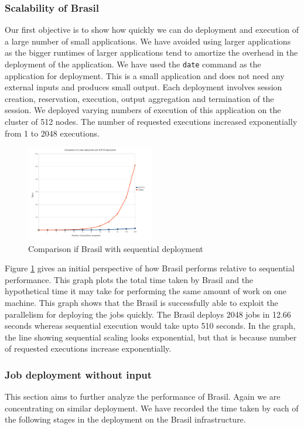 \documentclass[conference]{sig-alternate}
\begin{document}
\subsubsection{Scalability of Brasil}
Our first objective is to show how quickly we can do deployment and execution
of a large number of small applications. We have avoided using larger
applications as the bigger runtimes of larger applications tend to amortize the
overhead in the deployment of the application.  We have used the \texttt{date}
command as the application for deployment.  This is a small application and does
not need any external inputs and produces small output. Each deployment involves
session creation, reservation, execution, output aggregation and termination
of the session.  We deployed varying numbers of execution of this application on
the cluster of 512 nodes.  The number of requested executions increased
exponentially from 1 to 2048 executions.

\begin{figure}[h]
  \begin{center}
    \leavevmode
      \includegraphics[height=0.2\textheight,width=0.5\textwidth]
		{./img/linear}
    \caption{Comparison if Brasil with sequential deployment}
    \label{fig:sequential}
  \end{center}
\end{figure}

Figure \ref{fig:sequential} gives an initial perspective of how Brasil performs
relative to sequential performance.  This graph plots the total time taken by
Brasil and the hypothetical time it may take for performing the same amount of
work on one machine.  This graph shows that the Brasil is successfully able to
exploit the parallelism for deploying the jobs quickly. The Brasil deploys 2048
jobs in 12.66 seconds whereas sequential execution would take upto 510 seconds.
In the graph, the line showing sequential scaling looks exponential, but that is
because number of requested executions increase exponentially.


\subsubsection{Job deployment without input}
This section aims to further analyze the performance of Brasil.  Again we are 
concentrating on similar deployment.  We have recorded the time taken by each
of the following stages in the deployment on the Brasil infrastructure.
\end{document}
